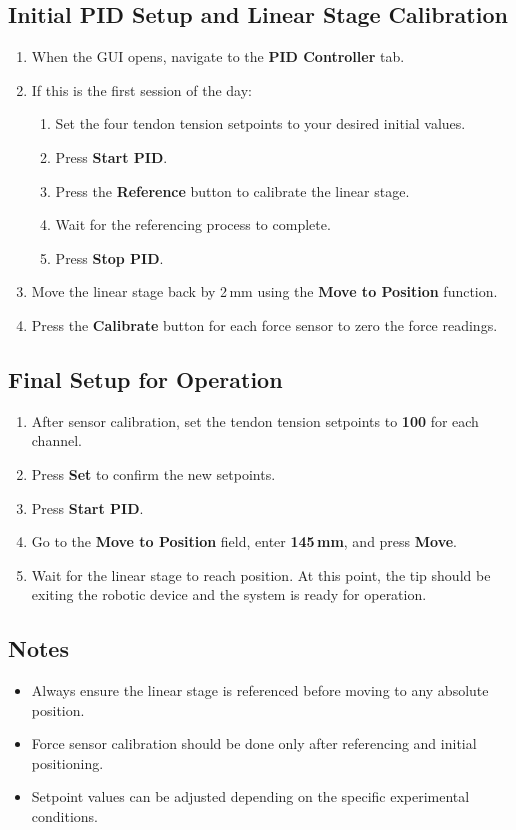 \subsection*{Initial PID Setup and Linear Stage Calibration}

\begin{enumerate}[resume]
    \item When the GUI opens, navigate to the \textbf{PID Controller} tab.
    \item If this is the first session of the day:
    \begin{enumerate}
        \item Set the four tendon tension setpoints to your desired initial values.
        \item Press \textbf{Start PID}.
        \item Press the \textbf{Reference} button to calibrate the linear stage.
        \item Wait for the referencing process to complete.
        \item Press \textbf{Stop PID}.
    \end{enumerate}
    \item Move the linear stage back by 2\,mm using the \textbf{Move to Position} function.
    \item Press the \textbf{Calibrate} button for each force sensor to zero the force readings.
\end{enumerate}

\subsection*{Final Setup for Operation}

\begin{enumerate}[resume]
    \item After sensor calibration, set the tendon tension setpoints to \textbf{100} for each channel.
    \item Press \textbf{Set} to confirm the new setpoints.
    \item Press \textbf{Start PID}.
    \item Go to the \textbf{Move to Position} field, enter \textbf{145\,mm}, and press \textbf{Move}.
    \item Wait for the linear stage to reach position. At this point, the tip should be exiting the robotic device and the system is ready for operation.
\end{enumerate}

\subsection*{Notes}
\begin{itemize}
    \item Always ensure the linear stage is referenced before moving to any absolute position.
    \item Force sensor calibration should be done only after referencing and initial positioning.
    \item Setpoint values can be adjusted depending on the specific experimental conditions.
\end{itemize}


